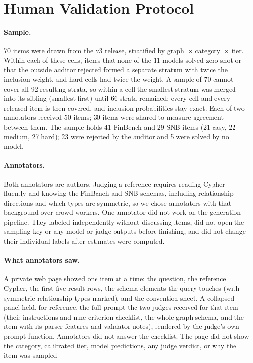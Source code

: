 \section{Human Validation Protocol}
\label{app:human}
\paragraph{Sample.} 70 items were drawn from the v3 release, stratified by graph~$\times$ category~$\times$ tier. Within each of these cells, items that none of the 11 models solved zero-shot or that the outside auditor rejected formed a separate stratum with twice the inclusion weight, and hard cells had twice the weight. A sample of 70 cannot cover all 92 resulting strata, so within a cell the smallest stratum was merged into its sibling (smallest first) until 66 strata remained; every cell and every released item is then covered, and inclusion probabilities stay exact. Each of two annotators received 50 items; 30 items were shared to measure agreement between them. The sample holds 41 FinBench and 29 SNB items (21 easy, 22 medium, 27 hard); 23 were rejected by the auditor and 5 were solved by no model.

\paragraph{Annotators.} Both annotators are authors. Judging a reference requires reading Cypher fluently and knowing the FinBench and SNB schemas, including relationship directions and which types are symmetric, so we chose annotators with that background over crowd workers. One annotator did not work on the generation pipeline. They labeled independently without discussing items, did not open the sampling key or any model or judge outputs before finishing, and did not change their individual labels after estimates were computed.

\paragraph{What annotators saw.} A private web page showed one item at a time: the question, the reference Cypher, the first five result rows, the schema elements the query touches (with symmetric relationship types marked), and the convention sheet. A collapsed panel held, for reference, the full prompt the two judges received for that item (their instructions and nine-criterion checklist, the whole graph schema, and the item with its parser features and validator notes), rendered by the judge's own prompt function. Annotators did not answer the checklist. The page did not show the category, calibrated tier, model predictions, any judge verdict, or why the item was sampled.

